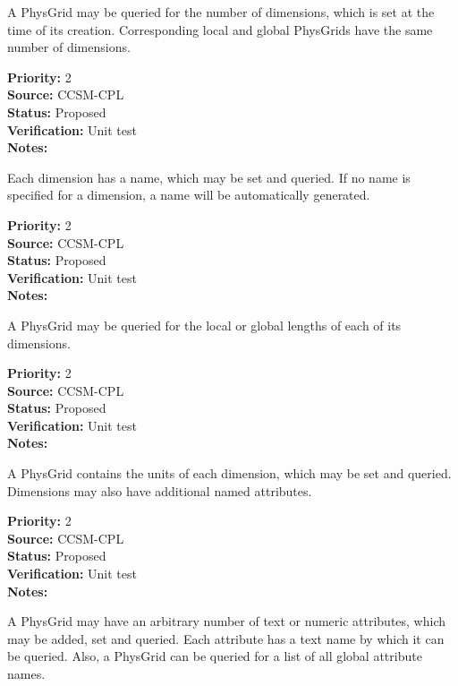 A PhysGrid may be queried for the number of dimensions, which is
set at the time of its creation.  Corresponding local and global PhysGrids have
the same number of dimensions.
\begin{reqlist}
{\bf Priority:} 2 \\
{\bf Source:} CCSM-CPL \\
{\bf Status:} Proposed \\
{\bf Verification:} Unit test \\
{\bf Notes:} 
\end{reqlist}

Each dimension has a name, which may be set and queried.  If no name is specified
for a dimension, a name will be automatically generated.
\begin{reqlist}
{\bf Priority:} 2 \\
{\bf Source:} CCSM-CPL \\
{\bf Status:} Proposed \\
{\bf Verification:} Unit test \\
{\bf Notes:} 
\end{reqlist}

A PhysGrid may be queried for the local or global lengths of each of its dimensions.
\begin{reqlist}
{\bf Priority:} 2 \\
{\bf Source:} CCSM-CPL \\
{\bf Status:} Proposed \\
{\bf Verification:} Unit test \\
{\bf Notes:} 
\end{reqlist}

A PhysGrid contains the units of each dimension, which may be set and queried. 
Dimensions may also have additional named attributes.
\begin{reqlist}
{\bf Priority:} 2 \\
{\bf Source:} CCSM-CPL \\
{\bf Status:} Proposed \\
{\bf Verification:} Unit test \\
{\bf Notes:} 
\end{reqlist}

A PhysGrid may have an arbitrary number of text or numeric attributes,
which may be added, set and queried.  Each attribute has a text name by which it
can be queried.  Also, a PhysGrid can be queried for a list of all global
attribute names.

